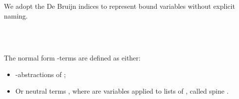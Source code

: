 We adopt the De Bruijn indices to represent bound variables without explicit naming.

\begin{code}%
\>[0]\AgdaSpace{}%
\AgdaSpace{}%
\AgdaSymbol{:}\AgdaSpace{}%
\AgdaSpace{}%
\AgdaSpace{}%
\AgdaSpace{}%
\AgdaSpace{}%
\AgdaSpace{}%
\<%
\\
\>[0][@{}l@{\AgdaIndent{0}}]%
\>[2]\AgdaSpace{}%
\AgdaSymbol{:}\AgdaSpace{}%
\AgdaSpace{}%
\AgdaSymbol{(}\AgdaSpace{}%
\AgdaSpace{}%
\AgdaSymbol{)}\AgdaSpace{}%
\<%
\\
%
\>[2]\AgdaSpace{}%
\AgdaSymbol{:}\AgdaSpace{}%
\AgdaSpace{}%
\AgdaSpace{}%
\AgdaSpace{}%
\AgdaSpace{}%
\AgdaSpace{}%
\AgdaSymbol{(}\AgdaSpace{}%
\AgdaSpace{}%
\AgdaSymbol{)}\AgdaSpace{}%
\<%
\end{code}

\begin{code}[hide]%
\>[0]\<%
\end{code}

The normal form \lambda-terms  are defined as either:

\begin{itemize}
  \item{\lambda-abstractions of ;}
  \item{Or neutral terms , where  are variables  applied to lists of , called spine }.
\end{itemize}

